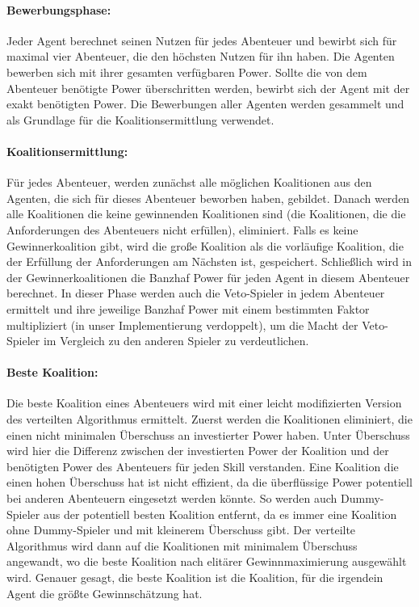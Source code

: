 \documentclass[fleqn,10pt]{SelfArx} %
\begin{document}
\paragraph{Bewerbungsphase:}
Jeder Agent berechnet seinen Nutzen für jedes Abenteuer und bewirbt sich für maximal vier Abenteuer, die den höchsten Nutzen für ihn haben. Die Agenten bewerben sich mit ihrer gesamten verfügbaren Power. Sollte die von dem Abenteuer benötigte Power überschritten werden, bewirbt sich der Agent mit der exakt benötigten Power. Die Bewerbungen aller Agenten werden gesammelt und als Grundlage für die Koalitionsermittlung verwendet. 

\paragraph{Koalitionsermittlung:}
Für jedes Abenteuer, werden zunächst alle möglichen Koalitionen aus den Agenten, die sich für dieses Abenteuer beworben haben, gebildet. Danach werden alle Koalitionen die keine gewinnenden Koalitionen sind (die Koalitionen, die die Anforderungen des Abenteuers nicht erfüllen), eliminiert. Falls es keine Gewinnerkoalition gibt, wird die große Koalition als die vorläufige Koalition, die der Erfüllung der Anforderungen am Nächsten ist, gespeichert. Schließlich wird in der Gewinnerkoalitionen die Banzhaf Power für jeden Agent in diesem Abenteuer berechnet. In dieser Phase werden auch die Veto-Spieler in jedem Abenteuer ermittelt und ihre jeweilige Banzhaf Power mit einem bestimmten Faktor multipliziert (in unser Implementierung verdoppelt), um die Macht der Veto-Spieler im Vergleich zu den anderen Spieler zu verdeutlichen. 

\paragraph{Beste Koalition:}
Die beste Koalition eines Abenteuers wird mit einer leicht modifizierten Version des verteilten Algorithmus ermittelt. Zuerst werden die Koalitionen eliminiert, die einen nicht minimalen Überschuss an investierter Power haben. Unter Überschuss wird hier die Differenz zwischen der investierten Power der Koalition und der benötigten Power des Abenteuers für jeden Skill verstanden. Eine Koalition die einen hohen Überschuss hat ist nicht effizient, da die überflüssige Power potentiell bei anderen Abenteuern eingesetzt werden könnte. So werden auch Dummy-Spieler aus der potentiell besten Koalition entfernt, da es immer eine Koalition ohne Dummy-Spieler und mit kleinerem Überschuss gibt. Der verteilte Algorithmus wird dann auf die Koalitionen mit minimalem Überschuss angewandt, wo die beste Koalition nach elitärer Gewinnmaximierung ausgewählt wird. Genauer gesagt, die beste Koalition ist die Koalition, für die irgendein Agent die größte Gewinnschätzung hat.
\end{document}
